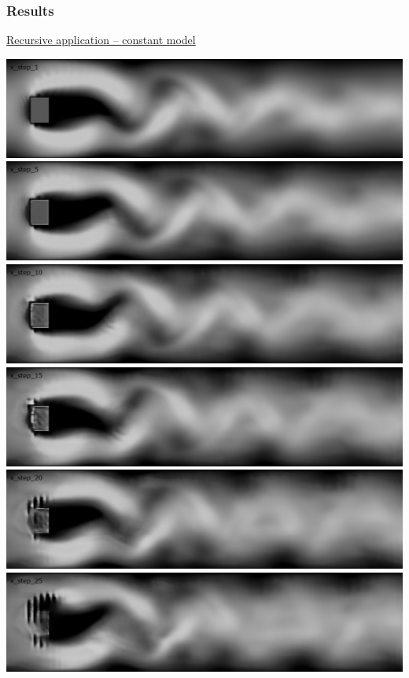 \documentclass[18pt]{beamer}
\begin{document}
\begin{frame}[t]
  \frametitle{Results}
   \vspace{-0.5cm}
  \begin{center}
    {\large \underline{Recursive application -- constant model}} \\
  \end{center}
  \vspace{0.5cm}
  \begin{center}
    \includegraphics[scale=0.15]{images/res/x_step_1}
    \includegraphics[scale=0.15]{images/res/x_step_5}
    \includegraphics[scale=0.15]{images/res/x_step_10}
    \includegraphics[scale=0.15]{images/res/x_step_15}
    \includegraphics[scale=0.15]{images/res/x_step_20}
    \includegraphics[scale=0.15]{images/res/x_step_25}
  \end{center}
\end{frame}
\end{document}
